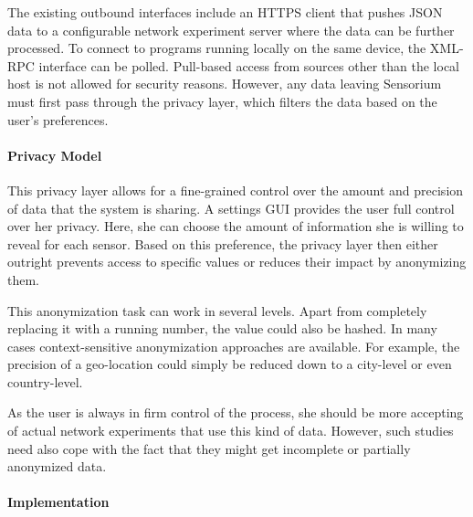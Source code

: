 The existing outbound interfaces include an \gls{HTTPS} client that pushes \acrshort{JSON} data to a configurable network experiment server where the data can be further processed. To connect to programs running locally on the same device, the \acrshort{XML}-\acrshort{RPC} interface can be polled. Pull-based access from sources other than the local host is not allowed for security reasons. However, any data leaving Sensorium must first pass through the privacy layer, which filters the data based on the user's preferences.


\paragraph{Privacy Model}

This privacy layer allows for a fine-grained control over the amount and precision of data that the system is sharing. A settings \acrshort{GUI} provides the user full control over her privacy. Here, she can choose the amount of information she is willing to reveal for each sensor. Based on this preference, the privacy layer then either outright prevents access to specific values or reduces their impact by anonymizing them.

This anonymization task can work in several levels. Apart from completely replacing it with a running number, the value could also be hashed. In many cases context-sensitive anonymization approaches are available. For example, the precision of a geo-location could simply be reduced down to a city-level or even country-level.

As the user is always in firm control of the process, she should be more accepting of actual network experiments that use this kind of data. However, such studies need also cope with the fact that they might get incomplete or partially anonymized data.


\paragraph{Implementation}


